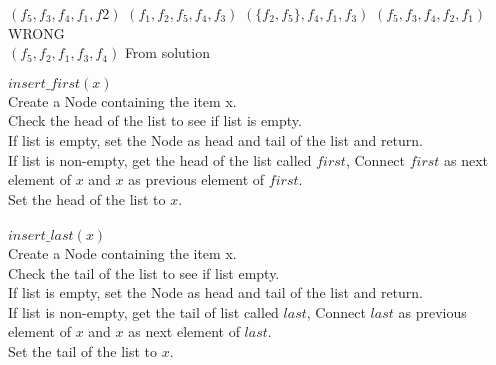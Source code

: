 \documentclass[12pt,twoside]{article}
\begin{document}


\begin{problems}

\problem  %

\begin{problemparts}
\problempart %
$(f_5, f_3, f_4, f_1, f2)$
\problempart %
$(f_1, f_2, f_5, f_4, f_3)$
\problempart %
$(\{f_2, f_5\}, f_4, f_1, f_3)$
\problempart %
$(f_5, f_3, f_4, f_2, f_1)$ \quad WRONG \\
$(f_5, f_2, f_1, f_3, f_4)$ \quad From solution
\end{problemparts}

\newpage
\problem  %

\begin{problemparts}
\problempart %
\problempart %
\end{problemparts}

\newpage
\problem  %

\newpage
\problem  %

\begin{problemparts}
\problempart %
$insert\_first(x)$ \\
Create a Node containing the item x. \\
Check the head of the list to see if list is empty. \\
If list is empty, set the Node as head and tail of the list and return. \\
If list is non-empty, get the head of the list called $first$, Connect $first$ as next element of $x$ and $x$ as previous element of $first$. \\ 
Set the head of the list to $x$. \\ \\
$insert\_last(x)$ \\
Create a Node containing the item x. \\
Check the tail of the list to see if list empty. \\
If list is empty, set the Node as head and tail of the list and return. \\
If list is non-empty, get the tail of list called $last$,
Connect $last$ as previous element of $x$ and $x$ as next element of $last$.\\
Set the tail of the list to $x$. \\ \\


\end{problemparts}
\end{problems}
\end{document}
